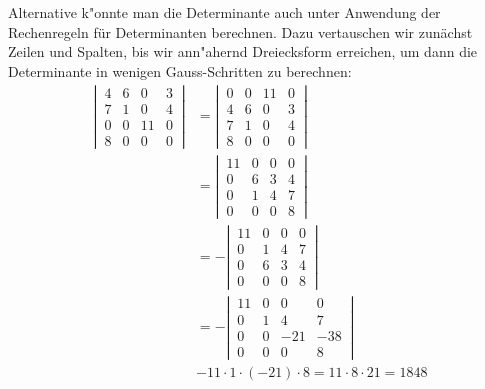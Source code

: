 \begin{loesung}
Alternative k"onnte man die Determinante auch unter Anwendung der
Rechenregeln f\"ur Determinanten berechnen. Dazu vertauschen wir
zun\"achst Zeilen und Spalten, bis wir ann"ahernd Dreiecksform erreichen,
um dann die Determinante in wenigen Gauss-Schritten zu berechnen:
\begin{align*}
\left|\,\begin{matrix}
4&6& 0&3\\
7&1& 0&4\\
0&0&11&0\\
8&0& 0&0
\end{matrix}\,\right|
&=
\left|\,\begin{matrix}
0&0&11&0\\
4&6& 0&3\\
7&1& 0&4\\
8&0& 0&0
\end{matrix}\,\right|
\\
&=
\left|\,\begin{matrix}
11&0&0&0\\
 0&6&3&4\\
 0&1&4&7\\
 0&0&0&8
\end{matrix}\,\right|\\
&=
-\left|\,\begin{matrix}
11&0&0&0\\
 0&1&4&7\\
 0&6&3&4\\
 0&0&0&8
\end{matrix}\,\right|\\
&=
-\left|\,\begin{matrix}
11&0&  0&  0\\
 0&1&  4&  7\\
 0&0&-21&-38\\
 0&0&  0&  8
\end{matrix}\,\right|\\
&-11\cdot 1\cdot (-21)\cdot 8=11\cdot 8\cdot 21=1848
\end{align*}
\end{loesung}
